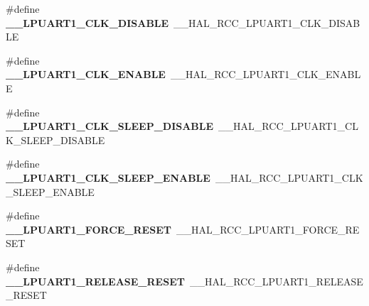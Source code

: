 \begin{DoxyCompactItemize}
\item 
\hypertarget{group___h_a_l___r_c_c___aliased_gaed58b8ae517de9035a76e9c804087fa6}{\#define {\bfseries \-\_\-\-\_\-\-L\-P\-U\-A\-R\-T1\-\_\-\-C\-L\-K\-\_\-\-D\-I\-S\-A\-B\-L\-E}~\-\_\-\-\_\-\-H\-A\-L\-\_\-\-R\-C\-C\-\_\-\-L\-P\-U\-A\-R\-T1\-\_\-\-C\-L\-K\-\_\-\-D\-I\-S\-A\-B\-L\-E}\label{group___h_a_l___r_c_c___aliased_gaed58b8ae517de9035a76e9c804087fa6}

\item 
\hypertarget{group___h_a_l___r_c_c___aliased_ga31a3336329cc12613dc4741af218dcca}{\#define {\bfseries \-\_\-\-\_\-\-L\-P\-U\-A\-R\-T1\-\_\-\-C\-L\-K\-\_\-\-E\-N\-A\-B\-L\-E}~\-\_\-\-\_\-\-H\-A\-L\-\_\-\-R\-C\-C\-\_\-\-L\-P\-U\-A\-R\-T1\-\_\-\-C\-L\-K\-\_\-\-E\-N\-A\-B\-L\-E}\label{group___h_a_l___r_c_c___aliased_ga31a3336329cc12613dc4741af218dcca}

\item 
\hypertarget{group___h_a_l___r_c_c___aliased_ga932fe128bb4feb05c8feec3783e08499}{\#define {\bfseries \-\_\-\-\_\-\-L\-P\-U\-A\-R\-T1\-\_\-\-C\-L\-K\-\_\-\-S\-L\-E\-E\-P\-\_\-\-D\-I\-S\-A\-B\-L\-E}~\-\_\-\-\_\-\-H\-A\-L\-\_\-\-R\-C\-C\-\_\-\-L\-P\-U\-A\-R\-T1\-\_\-\-C\-L\-K\-\_\-\-S\-L\-E\-E\-P\-\_\-\-D\-I\-S\-A\-B\-L\-E}\label{group___h_a_l___r_c_c___aliased_ga932fe128bb4feb05c8feec3783e08499}

\item 
\hypertarget{group___h_a_l___r_c_c___aliased_gac9485ddfd5a22a336990ed612758384e}{\#define {\bfseries \-\_\-\-\_\-\-L\-P\-U\-A\-R\-T1\-\_\-\-C\-L\-K\-\_\-\-S\-L\-E\-E\-P\-\_\-\-E\-N\-A\-B\-L\-E}~\-\_\-\-\_\-\-H\-A\-L\-\_\-\-R\-C\-C\-\_\-\-L\-P\-U\-A\-R\-T1\-\_\-\-C\-L\-K\-\_\-\-S\-L\-E\-E\-P\-\_\-\-E\-N\-A\-B\-L\-E}\label{group___h_a_l___r_c_c___aliased_gac9485ddfd5a22a336990ed612758384e}

\item 
\hypertarget{group___h_a_l___r_c_c___aliased_gaee163600587d77d2a199481ca6935c1b}{\#define {\bfseries \-\_\-\-\_\-\-L\-P\-U\-A\-R\-T1\-\_\-\-F\-O\-R\-C\-E\-\_\-\-R\-E\-S\-E\-T}~\-\_\-\-\_\-\-H\-A\-L\-\_\-\-R\-C\-C\-\_\-\-L\-P\-U\-A\-R\-T1\-\_\-\-F\-O\-R\-C\-E\-\_\-\-R\-E\-S\-E\-T}\label{group___h_a_l___r_c_c___aliased_gaee163600587d77d2a199481ca6935c1b}

\item 
\hypertarget{group___h_a_l___r_c_c___aliased_gaa785c5b0b6b59ec86a4a33307071d8b1}{\#define {\bfseries \-\_\-\-\_\-\-L\-P\-U\-A\-R\-T1\-\_\-\-R\-E\-L\-E\-A\-S\-E\-\_\-\-R\-E\-S\-E\-T}~\-\_\-\-\_\-\-H\-A\-L\-\_\-\-R\-C\-C\-\_\-\-L\-P\-U\-A\-R\-T1\-\_\-\-R\-E\-L\-E\-A\-S\-E\-\_\-\-R\-E\-S\-E\-T}\label{group___h_a_l___r_c_c___aliased_gaa785c5b0b6b59ec86a4a33307071d8b1}


\end{DoxyCompactItemize}
